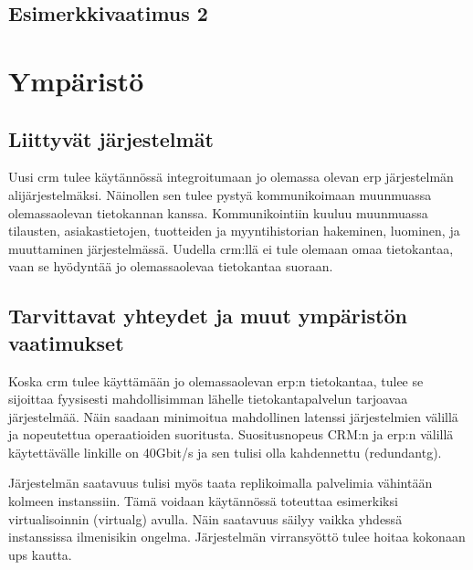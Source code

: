     \subsection{Esimerkkivaatimus 2}





\section{Ympäristö}     %
    \subsection{Liittyvät järjestelmät}     %
        Uusi \gls{crm} tulee käytännössä integroitumaan jo olemassa olevan \gls{erp} järjestelmän alijärjestelmäksi. Näinollen sen tulee pystyä kommunikoimaan muunmuassa olemassaolevan tietokannan kanssa. Kommunikointiin kuuluu muunmuassa tilausten, asiakastietojen, tuotteiden ja myyntihistorian hakeminen, luominen, ja muuttaminen järjestelmässä. Uudella \gls{crm}:llä ei tule olemaan omaa tietokantaa, vaan se hyödyntää jo olemassaolevaa tietokantaa suoraan. 


    \subsection{Tarvittavat yhteydet ja muut ympäristön vaatimukset}  %
        Koska \gls{crm} tulee käyttämään jo olemassaolevan \gls{erp}:n tietokantaa, tulee se sijoittaa fyysisesti mahdollisimman lähelle tietokantapalvelun tarjoavaa järjestelmää. Näin saadaan minimoitua mahdollinen latenssi järjestelmien välillä ja nopeutettua operaatioiden suoritusta. Suositusnopeus \gls{CRM}:n ja \gls{erp}:n välillä käytettävälle linkille on 40Gbit/s ja sen tulisi olla kahdennettu (\gls{redundantg}). 

        Järjestelmän saatavuus tulisi myös taata replikoimalla palvelimia vähintään kolmeen instanssiin. Tämä voidaan käytännössä toteuttaa esimerkiksi virtualisoinnin (\gls{virtualg}) avulla. Näin saatavuus säilyy vaikka yhdessä instanssissa ilmenisikin ongelma. Järjestelmän virransyöttö tulee hoitaa kokonaan \gls{ups} kautta. 

